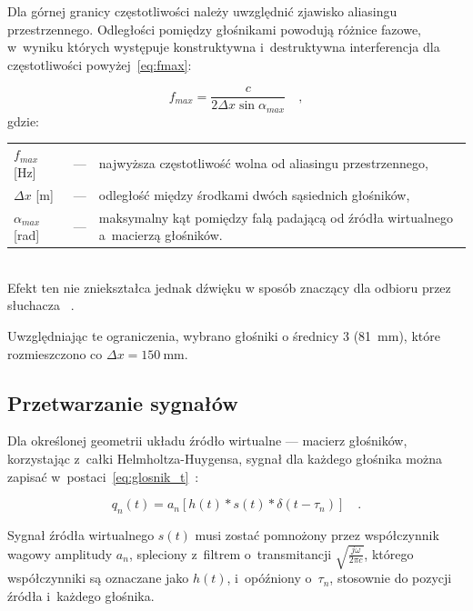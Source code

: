 \documentclass[10pt, a4paper]{article}
\let\Oldsubsection\subsection
\renewcommand{\subsection}{\FloatBarrier\Oldsubsection}
\begin{document}
Dla górnej granicy częstotliwości należy uwzględnić zjawisko aliasingu
przestrzennego. Odległości pomiędzy głośnikami powodują różnice fazowe, w~wyniku których 
występuje konstruktywna i~destruktywna interferencja dla częstotliwości powyżej~\eqref{eq:fmax}:

\begin{equation}
  f_{max}=\frac{c}{2\Delta x \sin{\alpha_{max}}} \quad, \label{eq:fmax}
\end{equation}
gdzie:\\
\indent \begin{tabular}{l c p{}}
  $f_{max}$ [\si{\hertz}] & --- & najwyższa częstotliwość wolna od aliasingu przestrzennego, \\
  $\Delta x$ [\si{\metre}] & --- & odległość między środkami dwóch sąsiednich głośników, \\
  $\alpha_{max}$ [\si{\radian}] & --- & maksymalny kąt pomiędzy falą padającą od źródła 
wirtualnego a~macierzą głośników.\\
\end{tabular}\\

\noindent Efekt ten nie zniekształca jednak dźwięku w sposób znaczący dla odbioru przez słuchacza
~\cite{hq_rendering}.

Uwzględniając te ograniczenia, wybrano głośniki o średnicy \SI{3}{\inch}
(\SI{81}{\milli\meter}), które rozmieszczono co
$\Delta x=\SI{150}{\milli\meter}$.

\subsection{Przetwarzanie sygnałów}\label{s:algorithm}

Dla określonej geometrii układu źródło wirtualne --- macierz głośników,
korzystając z~całki Helmholtza-Huygensa, sygnał dla każdego głośnika można zapisać
w~postaci~\eqref{eq:glosnik_t}~\cite{enhancement}:

\begin{equation}
  q_n(t) = a_n\left[h(t)*s(t)*\delta(t-\tau_n)\right] \quad. \label{eq:glosnik_t}
\end{equation}

Sygnał źródła wirtualnego $s(t)$ musi zostać pomnożony przez współczynnik wagowy 
amplitudy $a_n$, spleciony z~filtrem o~transmitancji $\sqrt{\frac{j\omega}{2\pi c}}$, 
którego współczynniki są oznaczane jako $h(t)$, i~opóźniony o~$\tau_n$, stosownie do
pozycji źródła i~każdego głośnika.
\end{document}
